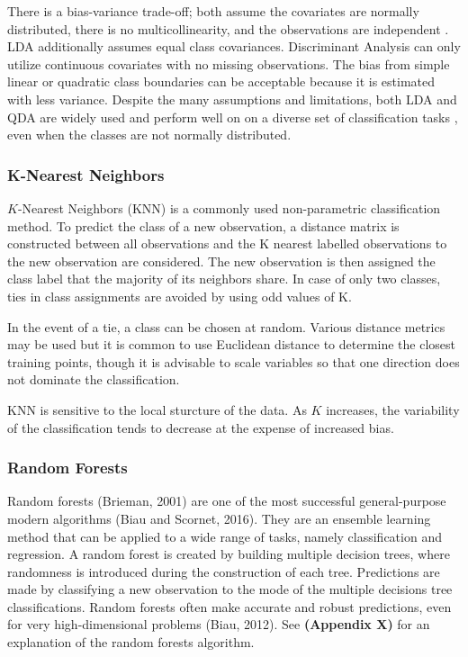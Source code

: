 \documentclass[12pt,]{article}
\begin{document}
There is a bias-variance trade-off; both assume the covariates are
normally distributed, there is no multicollinearity, and the
observations are independent \citep{cover_geometrical_1965}. LDA
additionally assumes equal class covariances. Discriminant Analysis can
only utilize continuous covariates with no missing observations. The
bias from simple linear or quadratic class boundaries can be acceptable
because it is estimated with less variance. Despite the many assumptions
and limitations, both LDA and QDA are widely used and perform well on on
a diverse set of classification tasks \citep{hastie_elements_2009}, even
when the classes are not normally distributed.

\subsubsection{K-Nearest Neighbors}\label{k-nearest-neighbors}

\(K\)-Nearest Neighbors (KNN) is a commonly used non-parametric
classification method. To predict the class of a new observation, a
distance matrix is constructed between all observations and the K
nearest labelled observations to the new observation are considered. The
new observation is then assigned the class label that the majority of
its neighbors share. In case of only two classes, ties in class
assignments are avoided by using odd values of K.

In the event of a tie, a class can be chosen at random. Various distance
metrics may be used but it is common to use Euclidean distance to
determine the closest training points, though it is advisable to scale
variables so that one direction does not dominate the classification.

KNN is sensitive to the local sturcture of the data. As \(K\) increases,
the variability of the classification tends to decrease at the expense
of increased bias.

\subsubsection{Random Forests}\label{random-forests}

Random forests (Brieman, 2001) are one of the most successful
general-purpose modern algorithms (Biau and Scornet, 2016). They are an
ensemble learning method that can be applied to a wide range of tasks,
namely classification and regression. A random forest is created by
building multiple decision trees, where randomness is introduced during
the construction of each tree. Predictions are made by classifying a new
observation to the mode of the multiple decisions tree classifications.
Random forests often make accurate and robust predictions, even for very
high-dimensional problems (Biau, 2012). See \textbf{(Appendix X)} for an
explanation of the random forests algorithm.
\end{document}
